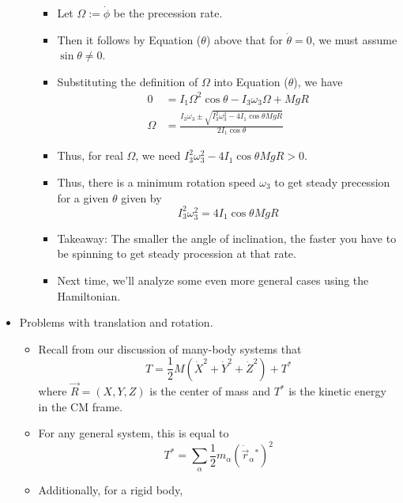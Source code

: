 \documentclass[../notes.tex]{subfiles}
\begin{document}
\begin{itemize}
\begin{itemize}
\begin{itemize}
            \item Let $\Omega:=\dot{\phi}$ be the precession rate.
            \item Then it follows by Equation ($\theta$) above that for $\dot{\theta}=0$, we must assume $\sin\theta\neq 0$.
            \item Substituting the definition of $\Omega$ into Equation ($\theta$), we have
            \begin{align*}
                0 &= I_1\Omega^2\cos\theta-I_3\omega_3\Omega+MgR\\
                \Omega &= \frac{I_3\omega_3\pm\sqrt{I_3^2\omega_3^2-4I_1\cos\theta MgR}}{2I_1\cos\theta}
            \end{align*}
            \item Thus, for real $\Omega$, we need $I_3^2\omega_3^2-4I_1\cos\theta MgR>0$.
            \item Thus, there is a minimum rotation speed $\omega_3$ to get steady precession for a given $\theta$ given by
            \begin{equation*}
                I_3^2\omega_3^2 = 4I_1\cos\theta MgR
            \end{equation*}
            \item Takeaway: The smaller the angle of inclination, the faster you have to be spinning to get steady procession at that rate.
            \item Next time, we'll analyze some even more general cases using the Hamiltonian.
        \end{itemize}
    \end{itemize}
    \item Problems with translation and rotation.
    \begin{itemize}
        \item Recall from our discussion of many-body systems that
        \begin{equation*}
            T = \frac{1}{2}M(\dot{X}^2+\dot{Y}^2+\dot{Z}^2)+T^*
        \end{equation*}
        where $\vec{R}=(X,Y,Z)$ is the center of mass and $T^*$ is the kinetic energy in the CM frame.
        \item For any general system, this is equal to
        \begin{equation*}
            T^* = \sum_\alpha\frac{1}{2}m_\alpha(\dot{\vec{r}}_\alpha{}^*)^2
        \end{equation*}
        \item Additionally, for a rigid body,

\end{itemize}
\end{itemize}
\end{document}
